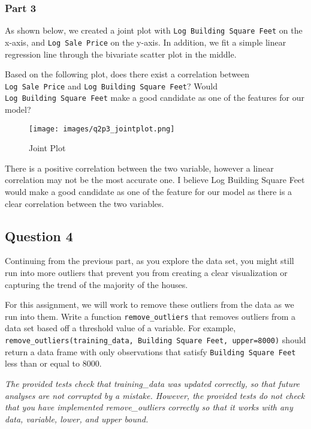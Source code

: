 \documentclass[11pt]{article}
\begin{document}
\hypertarget{part-3}{%
\subsubsection{Part 3}\label{part-3}}

As shown below, we created a joint plot with
\texttt{Log\ Building\ Square\ Feet} on the x-axis, and
\texttt{Log\ Sale\ Price} on the y-axis. In addition, we fit a simple
linear regression line through the bivariate scatter plot in the middle.

Based on the following plot, does there exist a correlation between
\texttt{Log\ Sale\ Price} and \texttt{Log\ Building\ Square\ Feet}?
Would \texttt{Log\ Building\ Square\ Feet} make a good candidate as one
of the features for our model?

\begin{figure}
\centering
\texttt{[image: images/q2p3\_jointplot.png]}
\caption{Joint Plot}
\end{figure}

    There is a positive correlation between the two variable, however a
linear correlation may not be the most accurate one. I believe Log
Building Square Feet would make a good candidate as one of the feature
for our model as there is a clear correlation between the two variables.

    \hypertarget{question-4}{%
\subsection{Question 4}\label{question-4}}

Continuing from the previous part, as you explore the data set, you
might still run into more outliers that prevent you from creating a
clear visualization or capturing the trend of the majority of the
houses.

For this assignment, we will work to remove these outliers from the data
as we run into them. Write a function \texttt{remove\_outliers} that
removes outliers from a data set based off a threshold value of a
variable. For example,
\texttt{remove\_outliers(training\_data,\ \textquotesingle{}Building\ Square\ Feet\textquotesingle{},\ upper=8000)}
should return a data frame with only observations that satisfy
\texttt{Building\ Square\ Feet} less than or equal to 8000.

\emph{The provided tests check that training\_data was updated
correctly, so that future analyses are not corrupted by a mistake.
However, the provided tests do not check that you have implemented
remove\_outliers correctly so that it works with any data, variable,
lower, and upper bound.}
\end{document}

